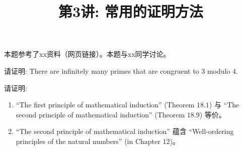 \documentclass[a4paper, justified]{tufte-handout}
\title{第3讲: 常用的证明方法}
\date{\zhtoday} %
\begin{document}
\maketitle
\noplagiarism %
\begin{abstract}
  \begin{center}{}
  \end{center}
\end{abstract}
\beginrequired

\begin{problem}[UD Problem $5.12$: $3k + 2$]
\end{problem}

\begin{remark}
本题参考了xx资料（网页链接）。本题与xx同学讨论。
\end{remark}

\begin{solution}
\end{solution}

\begin{problem}
\end{problem}

\begin{solution}
\end{solution}

\begin{problem}
  请证明: There are infinitely many primes 
  that are congruent to 3 modulo 4.
\end{problem}

\begin{solution}
\end{solution}

\begin{problem}
  请证明: 
  \begin{enumerate}[(1)]
    \item ``The first principle of mathematical induction'' (Theorem $18.1$)
      与 ``The second principle of mathematical induction'' (Theorem $18.9$) 等价。
    \item ``The second principle of mathematical induction'' 蕴含 
      ``Well-ordering principles of the natural numbers'' (in Chapter 12)。
  \end{enumerate}
\end{problem}
\end{document}

